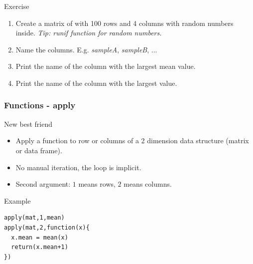 \documentclass[10pt]{beamer}
\newenvironment{xframe}[2][]
  {\begin{frame}[fragile,environment=xframe,#1]
  \frametitle{#2}}
  {\end{frame}}
\begin{document}

\begin{frame}{Exercise}
  \begin{enumerate}
  \item Create a matrix of with 100 rows and 4 columns with random numbers inside. {\scriptsize\it Tip: {\sf runif} function for random numbers.}
  \item Name the columns. E.g. {\it sampleA}, {\it sampleB}, ...
  \item Print the name of the column with the largest mean value.
  \item Print the name of the column with the largest value.
  \end{enumerate}
\end{frame}


\begin{xframe}{Functions - {\sf apply}}
  \begin{block}{New best friend}
    \begin{itemize}
    \item Apply a function to row or columns of a 2 dimension data structure (matrix or data frame).
    \item No manual iteration, the loop is implicit.
    \item Second argument: $1$ means rows, $2$ means columns.
    \end{itemize}
  \end{block}
  \begin{exampleblock}{Example}
\begin{verbatim}
apply(mat,1,mean)
apply(mat,2,function(x){
  x.mean = mean(x)
  return(x.mean+1)
})
\end{verbatim}  
  \end{exampleblock}
\end{xframe}

\end{document}
